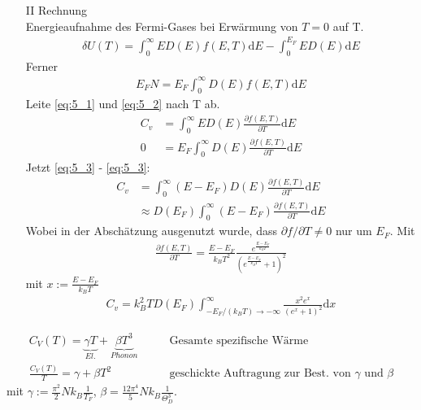 \begin{itemize}
\begin{itemize}
            \item[II] Rechnung \\
                Energieaufnahme des Fermi-Gases bei Erwärmung von $T=0$ auf T. \\
                \begin{align}
                    \delta U(T) = \int_0^\infty E D(E) f(E,T) \mathrm{d}E - \int_0^{E_F} E D(E) \mathrm{d}E \label{eq:5_1}
                \end{align} 
                Ferner
                \begin{align}
                    E_F N = E_F \int_0^\infty D(E) f(E,T) \mathrm{d} E \label{eq:5_2}
                \end{align}
                Leite \ref{eq:5_1} und \ref{eq:5_2} nach T ab.
                \begin{align}
                    C_v &= \int_0^\infty E D(E) \frac{\partial f(E,T)}{\partial T} \mathrm{d}E \label{eq:5_3} \\
                    0 &= E_F \int_0^\infty D(E) \frac{\partial f(E,T)}{\partial T} \mathrm{d}E \label{eq:5_4}
                \end{align} 
                Jetzt \ref{eq:5_3} - \ref{eq:5_3}:
                \begin{align}
                    C_v &= \int_0^\infty (E - E_F) D(E) \frac{\partial f(E,T)}{\partial T} \mathrm{d}E \\
                    &\approx D(E_F) \int_0^\infty (E - E_F) \frac{\partial f(E,T)}{\partial T} \mathrm{d}E
                \end{align}
                Wobei in der Abschätzung ausgenutzt wurde, dass $\partial f/\partial T \neq 0 $ nur um $E_F$. Mit
                \begin{align}
                    \frac{\partial f(E,T)}{\partial T} = \frac{E-E_F}{k_B T^2} \frac{e^{\frac{E-E_F}{k_BT}}}{\left(e^{\frac{E-E_F}{k_BT}} + 1\right)^2}
                \end{align}
                mit $x := \frac{E-E_F}{k_B T}$
                \begin{align}
                C_v = k_B^2 T D(E_F) \int_{-E_F / (k_B T) \rightarrow - \infty}^\infty \frac{x^2e^x}{(e^x+1)^2}\mathrm{d}x
                \end{align}
                {\centering
                }
        \end{itemize}
\begin{align*}
    C_V(T) = \underbrace{\gamma T}_{El.} + \underbrace{\beta T^3}_{Phonon} \qquad &\text{Gesamte spezifische Wärme}\\
    \frac{C_V(T)}{T} = \gamma + \beta T^2 \qquad &\text{geschickte Auftragung zur Best. von $\gamma$ und $\beta$}
\end{align*}
mit $\gamma := \frac{\pi^2}{2}N k_B \frac{1}{T_F}$, $\beta = \frac{12 \pi^4}{5} N k_B \frac{1}{\Theta_D^3}$.\\


\end{itemize}
